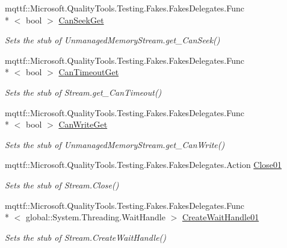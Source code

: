 \begin{DoxyCompactItemize}
mqttf\-::\-Microsoft.\-Quality\-Tools.\-Testing.\-Fakes.\-Fakes\-Delegates.\-Func\\*
$<$ bool $>$ \hyperlink{class_system_1_1_i_o_1_1_fakes_1_1_stub_unmanaged_memory_stream_a39e595644b42aaf90cd41431c1c90a4d}{Can\-Seek\-Get}
\begin{DoxyCompactList}\small\item\em Sets the stub of Unmanaged\-Memory\-Stream.\-get\-\_\-\-Can\-Seek()\end{DoxyCompactList}\item 
mqttf\-::\-Microsoft.\-Quality\-Tools.\-Testing.\-Fakes.\-Fakes\-Delegates.\-Func\\*
$<$ bool $>$ \hyperlink{class_system_1_1_i_o_1_1_fakes_1_1_stub_unmanaged_memory_stream_a53e8625f5b15551f849effbc3fee70c9}{Can\-Timeout\-Get}
\begin{DoxyCompactList}\small\item\em Sets the stub of Stream.\-get\-\_\-\-Can\-Timeout()\end{DoxyCompactList}\item 
mqttf\-::\-Microsoft.\-Quality\-Tools.\-Testing.\-Fakes.\-Fakes\-Delegates.\-Func\\*
$<$ bool $>$ \hyperlink{class_system_1_1_i_o_1_1_fakes_1_1_stub_unmanaged_memory_stream_a5ea41a17d349102183ff6587db353ee0}{Can\-Write\-Get}
\begin{DoxyCompactList}\small\item\em Sets the stub of Unmanaged\-Memory\-Stream.\-get\-\_\-\-Can\-Write()\end{DoxyCompactList}\item 
mqttf\-::\-Microsoft.\-Quality\-Tools.\-Testing.\-Fakes.\-Fakes\-Delegates.\-Action \hyperlink{class_system_1_1_i_o_1_1_fakes_1_1_stub_unmanaged_memory_stream_ad43e05d5f3194cf0252b490c3039feaf}{Close01}
\begin{DoxyCompactList}\small\item\em Sets the stub of Stream.\-Close()\end{DoxyCompactList}\item 
mqttf\-::\-Microsoft.\-Quality\-Tools.\-Testing.\-Fakes.\-Fakes\-Delegates.\-Func\\*
$<$ global\-::\-System.\-Threading.\-Wait\-Handle $>$ \hyperlink{class_system_1_1_i_o_1_1_fakes_1_1_stub_unmanaged_memory_stream_aa9da9792c308b4c48b2736c2d29e5458}{Create\-Wait\-Handle01}
\begin{DoxyCompactList}\small\item\em Sets the stub of Stream.\-Create\-Wait\-Handle()\end{DoxyCompactList}\item 

\end{DoxyCompactItemize}
